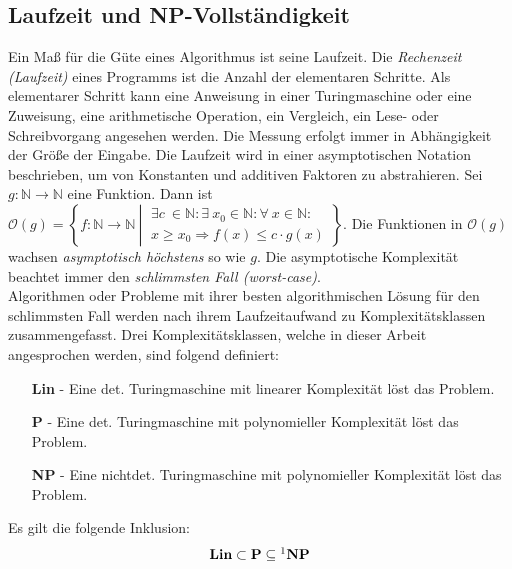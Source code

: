 \subsection{Laufzeit und NP-Vollständigkeit}
Ein Maß für die Güte eines Algorithmus ist seine Laufzeit. Die \emph{Rechenzeit (Laufzeit)} eines Programms ist die Anzahl der elementaren Schritte. Als elementarer Schritt kann eine Anweisung in einer Turingmaschine \cite{turing} oder eine Zuweisung, eine arithmetische Operation, ein Vergleich, ein Lese- oder Schreibvorgang angesehen werden.\newline\newline
Die Messung erfolgt immer in Abhängigkeit der Größe der Eingabe. Die Laufzeit wird in einer asymptotischen Notation beschrieben, um von Konstanten und additiven Faktoren zu abstrahieren.
Sei $g: {{\mathbb N}} \rightarrow {{\mathbb N}}$ eine Funktion.\newline\newline
Dann ist $\mathcal{O}(g) = \left\{ f:{{\mathbb N}} \rightarrow {{\mathbb N}} ~\left|~
\begin{array}{l}
\exists c~ \in {{\mathbb N}} : \exists~ x_0 \in {{\mathbb N}} : \forall~ x \in {{\mathbb N}} : \\
x \geq x_0 \Rightarrow f(x) \leq c \cdot g(x)
\end{array} \right. \right\}$\cite{buchwanke}.\newline\newline
Die Funktionen in $\mathcal{O}(g)$ wachsen \emph{asymptotisch h\"ochstens} so wie $g$. Die asymptotische Komplexität beachtet immer den \emph{schlimmsten Fall (worst-case)}.\\
Algorithmen oder Probleme mit ihrer besten algorithmischen Lösung für den schlimmsten Fall werden nach ihrem Laufzeitaufwand zu Komplexitätsklassen zusammengefasst. Drei Komplexitätsklassen, welche in dieser Arbeit angesprochen werden, sind folgend definiert:
\begin{itemize}
\item[\textbf{Lin}]- Eine det. Turingmaschine mit linearer Komplexität löst das Problem.
\item[\textbf{P}]- Eine det. Turingmaschine mit polynomieller Komplexität löst das Problem.
\item[\textbf{NP}]- Eine nichtdet. Turingmaschine mit polynomieller Komplexität löst das Problem.
\end{itemize}
Es gilt die folgende Inklusion: $$\textbf{Lin}\subset\textbf{P}\subseteq\footnote{\text{Ob \textbf{P}=\textbf{NP} oder \textbf{P}$\neq$ \textbf{NP} ist eins der größten noch offenen Probleme in der theoretischen Informatik}}\textbf{NP} $$
\newpage
